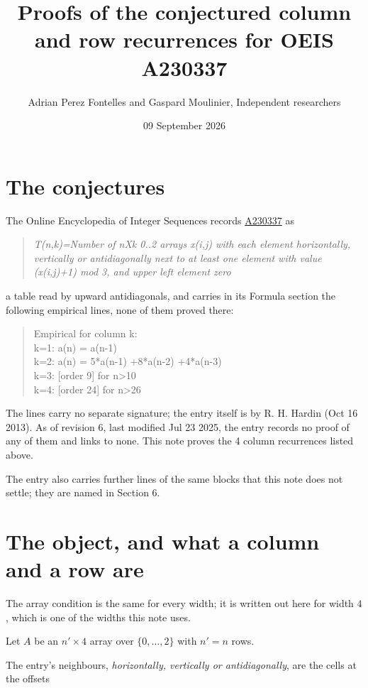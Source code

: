 \documentclass[11pt]{article}
\title{Proofs of the conjectured column and row recurrences for OEIS A230337}
\author{Adrian Perez Fontelles and Gaspard Moulinier, Independent researchers}
\date{09 September 2026}
\theoremstyle{definition}
\begin{document}
\maketitle
\section{The conjectures}

The Online Encyclopedia of Integer Sequences records \href{https://oeis.org/A230337}{A230337} as

\begin{quote}\itshape T(n,k)=Number of nXk 0..2 arrays x(i,j) with each element horizontally, vertically or antidiagonally next to at least one element with value (x(i,j)+1) mod 3, and upper left element zero\end{quote}

a table read by upward antidiagonals, and carries in its Formula section the following empirical lines, none of them proved there:

\begin{quote}\ttfamily Empirical for column k:\\
k=1: a(n) = a(n-1)\\k=2: a(n) = 5*a(n-1) +8*a(n-2) +4*a(n-3)\\k=3: [order 9] for n>10\\k=4: [order 24] for n>26\end{quote}

The lines carry no separate signature; the entry itself is by R. H. Hardin (Oct 16 2013). As of revision 6, last modified Jul 23 2025, the entry records no proof of any of them and links to none. This note proves the 4 column recurrences listed above.

The entry also carries further lines of the same blocks that this note does not settle; they are named in Section 6.

\section{The object, and what a column and a row are}

The array condition is the same for every width; it is written out here for width $4$, which is one of the widths this note uses.

Let $A$ be an $n' \times 4$ array over $\{0,\dots,2\}$ with $n' = n$ rows.

The entry's neighbours, {\itshape horizontally, vertically or antidiagonally}, are the cells at the offsets
\end{document}
